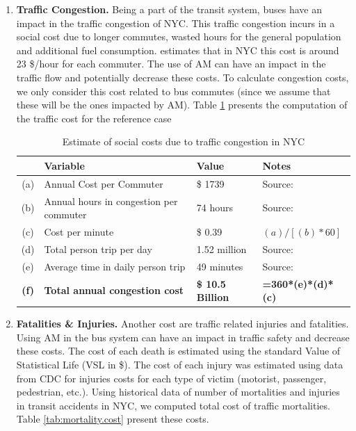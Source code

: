 \documentclass[11pt, letterpaper]{article}
\begin{document}
\begin{enumerate}[leftmargin=*]
\item \textbf{Traffic Congestion.}
  Being a part of the transit system, buses have an impact in the traffic congestion
  of NYC. This traffic congestion incurs in a social cost due to longer commutes, wasted hours for
  the general population and additional fuel consumption. \cite{UMR} estimates that in NYC this cost is
  around 23 \$/hour for each commuter. The use of AM can have an impact in the traffic flow and 
  potentially decrease these costs. To calculate congestion costs, we only consider this cost related 
  to bus commutes (since we assume that these will be the ones impacted by AM). Table \ref{tab:cong.cost} 
  presents the computation of the traffic cost for the reference case

\begin{table}[h]
\caption{Estimate of social costs due to traffic congestion in NYC}
\centering
\small
\renewcommand{\arraystretch}{1.1}
\begin{tabular}{c l l l}
\hline
 	& Variable 							& Value 				& Notes 						\\\hline\hline
(a)	& Annual Cost per Commuter				& \$ 1739				& Source:	\cite{UMR}	\\
(b)	& Annual hours in congestion per commuter	& 74 hours			& Source:	\cite{UMR} 	\\
(c)	& Cost per minute 						& \$ 0.39				& $(a)/[(b)*60]$		\\
(d)	& Total person trip per day					& 1.52 million			& Source: 	\cite{nyctransit}	\\
(e)	& Average time in daily person trip			& 49 minutes			& Source:	\cite{nyctransit}	\\
\textbf{(f)}	& \textbf{Total annual congestion cost}	& \textbf{\$ 10.5 Billion}	& \textbf{=360*(e)*(d)*(c)}			\\\hline\hline
\end{tabular}
\label{tab:cong.cost}
\end{table}%


\item \textbf{Fatalities \& Injuries.}  Another cost are traffic related injuries and fatalities.
  Using AM in the bus system can have an impact in traffic safety and decrease these costs.
  The cost of each death is estimated using the standard Value of Statistical Life (VSL in \$). The
  cost of each injury was estimated using data from CDC for injuries costs for each type of victim
  (motorist, passenger, pedestrian, etc.). Using historical data of number of mortalities and injuries in
  transit accidents in NYC, we computed total cost of traffic mortalities. Table \ref{tab:mortality.cost}
  present these costs.


\end{enumerate}
\end{document}
